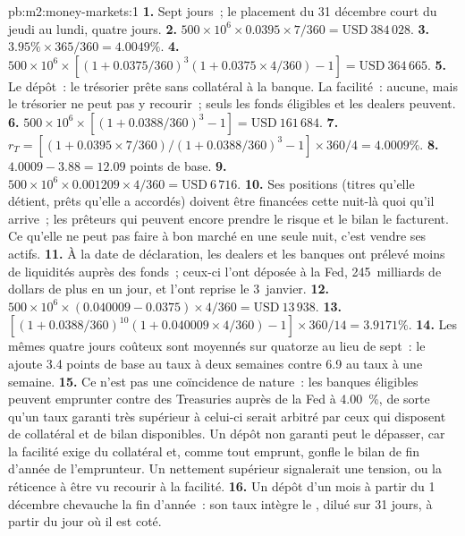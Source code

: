 \begin{solution}{pb:m2:money-markets:1}
\textbf{1.} Sept jours~; le placement du 31 décembre court du jeudi au lundi,
quatre jours.
\textbf{2.} $500 \times 10^6 \times 0.0395 \times 7/360 = \text{USD}~384\,028$.
\textbf{3.} $3.95\% \times 365/360 = 4.0049\%$.
\textbf{4.} $500 \times 10^6 \times [(1 + 0.0375/360)^3(1 + 0.0375 \times 4/360) -
1] = \text{USD}~364\,665$.
\textbf{5.} Le dépôt~: le trésorier prête sans collatéral à la banque. La
facilité~: aucune, mais le trésorier ne peut pas y recourir~; seuls les fonds éligibles et
les dealers peuvent.
\textbf{6.} $500 \times 10^6 \times [(1 + 0.0388/360)^3 - 1] = \text{USD}~161\,684$.
\textbf{7.} $r_T = [(1 + 0.0395 \times 7/360)/(1 + 0.0388/360)^3 - 1] \times
360/4 = 4.0009\%$.
\textbf{8.} $4.0009 - 3.88 = 12.09$ points de base.
\textbf{9.} $500 \times 10^6 \times 0.001209 \times 4/360 = \text{USD}~6\,716$.
\textbf{10.} Ses positions (titres qu'elle détient, prêts qu'elle a accordés) doivent être
financées cette nuit-là quoi qu'il arrive~; les prêteurs qui peuvent encore prendre le
risque et le bilan le facturent. Ce qu'elle ne peut pas faire à bon marché en
une seule nuit, c'est vendre ses actifs.
\textbf{11.} À la date de déclaration, les dealers et les banques ont prélevé moins de liquidités
auprès des fonds~; ceux-ci l'ont déposée à la Fed, 245~milliards de dollars de plus en un jour, et
l'ont reprise le 3~janvier.
\textbf{12.} $500 \times 10^6 \times (0.040009 - 0.0375) \times 4/360 =
\text{USD}~13\,938$.
\textbf{13.} $[(1 + 0.0388/360)^{10}(1 + 0.040009 \times 4/360) - 1] \times
360/14 = 3.9171\%$.
\textbf{14.} Les mêmes quatre jours coûteux sont moyennés sur quatorze au lieu de
sept~: le  ajoute 3.4 points de base au taux à deux semaines contre 6.9 au
taux à une semaine.
\textbf{15.} Ce n'est pas une coïncidence de nature~: les banques éligibles peuvent emprunter contre
des Treasuries auprès de la Fed à 4.00~\%, de sorte qu'un taux garanti très supérieur à celui-ci serait
arbitré par ceux qui disposent de collatéral et de bilan disponibles. Un
dépôt non garanti peut le dépasser, car la facilité exige du collatéral et,
comme tout emprunt, gonfle le bilan de fin d'année de l'emprunteur. Un  nettement supérieur signalerait une tension, ou la réticence à être vu recourir à la facilité.
\textbf{16.} Un dépôt d'un mois à partir du 1 décembre chevauche la fin d'année~: son
taux intègre le , dilué sur 31 jours, à partir du jour où il est coté.

\end{solution}

